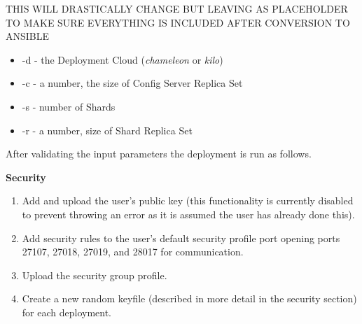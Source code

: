 \documentclass[9pt,twocolumn,twoside]{styles/osajnl}
\begin{document}
THIS WILL DRASTICALLY CHANGE BUT LEAVING AS PLACEHOLDER TO MAKE SURE EVERYTHING IS INCLUDED AFTER CONVERSION TO ANSIBLE

\vspace{-\topsep}
\begin{itemize}
\item -d - the Deployment Cloud (\emph{chameleon} or \emph{kilo})
\item -c - a number, the size of Config Server Replica Set
\item -s - number of Shards
\item -r - a number, size of Shard Replica Set
\end{itemize}
\vspace{-\topsep}

After validating the input parameters the deployment is run as follows.

\textbf{Security}
\vspace{-\topsep}
\begin{enumerate}
\item Add and upload the user's public key (this functionality is currently disabled to prevent throwing an error as it is assumed the user has already done this).
\item Add security rules to the user's default security profile port opening ports 27107, 27018, 27019, and 28017 for communication.
\item Upload the security group profile.
\item Create a new random keyfile (described in more detail in the security section) for each deployment.
\end{enumerate}
\vspace{-\topsep}
\end{document}
